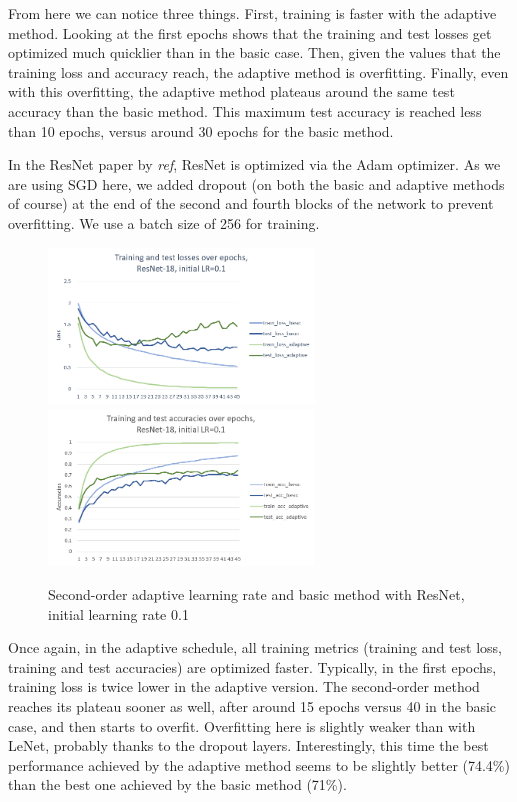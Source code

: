 \documentclass{article}
\begin{document}
  From here we can notice three things. First, training is faster with the adaptive method. Looking at the first epochs shows that the training and test losses get optimized much quicklier than in the basic case. Then, given the values that the training loss and accuracy reach, the adaptive method is overfitting. Finally, even with this overfitting, the adaptive method plateaus around the same test accuracy than the basic method. This maximum test accuracy is reached less than 10 epochs, versus around 30 epochs for the basic method. 
  
  In the ResNet paper by \emph{ref}, ResNet is optimized via the Adam optimizer. As we are using SGD here, we added dropout (on both the basic and adaptive methods of course) at the end of the second and fourth blocks of the network to prevent overfitting. We use a batch size of 256 for training.
  
  \begin{figure}[!h]
	\includegraphics[width=200pt]{loss_resnet_0_1.png}
	\includegraphics[width=200pt]{acc_resnet_0_1.png}
	\caption{Second-order adaptive learning rate and basic method with ResNet, initial learning rate 0.1}
\end{figure}
  
  Once again, in the adaptive schedule, all training metrics (training and test loss, training and test accuracies) are optimized faster. Typically, in the first epochs, training loss is twice lower in the adaptive version. The second-order method reaches its plateau sooner as well, after around 15 epochs versus 40 in the basic case, and then starts to overfit. Overfitting here is slightly weaker than with LeNet, probably thanks to the dropout layers. Interestingly, this time the best performance achieved by the adaptive method seems to be slightly better (74.4\%) than the best one achieved by the basic method (71\%).
  
\end{document}
